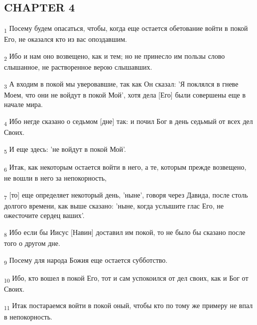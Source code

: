 \subsection{CHAPTER 4}
\begin{tcolorbox}
\textsubscript{1} Посему будем опасаться, чтобы, когда еще остается обетование войти в покой Его, не оказался кто из вас опоздавшим.
\end{tcolorbox}
\begin{tcolorbox}
\textsubscript{2} Ибо и нам оно возвещено, как и тем; но не принесло им пользы слово слышанное, не растворенное верою слышавших.
\end{tcolorbox}
\begin{tcolorbox}
\textsubscript{3} А входим в покой мы уверовавшие, так как Он сказал: 'Я поклялся в гневе Моем, что они не войдут в покой Мой', хотя дела [Его] были совершены еще в начале мира.
\end{tcolorbox}
\begin{tcolorbox}
\textsubscript{4} Ибо негде сказано о седьмом [дне] так: и почил Бог в день седьмый от всех дел Своих.
\end{tcolorbox}
\begin{tcolorbox}
\textsubscript{5} И еще здесь: 'не войдут в покой Мой'.
\end{tcolorbox}
\begin{tcolorbox}
\textsubscript{6} Итак, как некоторым остается войти в него, а те, которым прежде возвещено, не вошли в него за непокорность,
\end{tcolorbox}
\begin{tcolorbox}
\textsubscript{7} [то] еще определяет некоторый день, 'ныне', говоря через Давида, после столь долгого времени, как выше сказано: 'ныне, когда услышите глас Его, не ожесточите сердец ваших'.
\end{tcolorbox}
\begin{tcolorbox}
\textsubscript{8} Ибо если бы Иисус [Навин] доставил им покой, то не было бы сказано после того о другом дне.
\end{tcolorbox}
\begin{tcolorbox}
\textsubscript{9} Посему для народа Божия еще остается субботство.
\end{tcolorbox}
\begin{tcolorbox}
\textsubscript{10} Ибо, кто вошел в покой Его, тот и сам успокоился от дел своих, как и Бог от Своих.
\end{tcolorbox}
\begin{tcolorbox}
\textsubscript{11} Итак постараемся войти в покой оный, чтобы кто по тому же примеру не впал в непокорность.
\end{tcolorbox}
